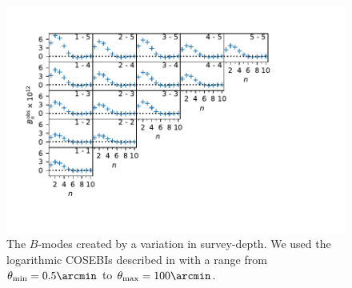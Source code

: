 \begin{figure}
\centering
\includegraphics[width = \textwidth, trim = {0 1.5cm 2.5cm 0}, clip]{images/bmodes.pdf}
\caption{The $B$-modes created by a variation in survey-depth. We used the logarithmic COSEBIs described in \citet{2010A&A...520A.116S} with a range from $\theta_{\rm min} = 0.5\arcmin$ to $\theta_{\rm max} = 100\arcmin$.}
\label{fig:bmodes_cosebi}
\end{figure}

